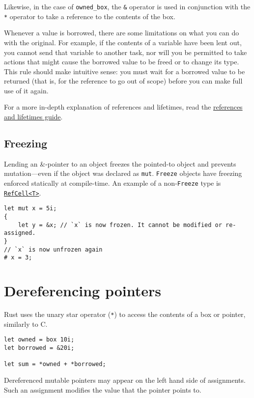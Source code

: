 \documentclass[]{article}
\begin{document}
Likewise, in the case of \texttt{owned\_box}, the \texttt{\&} operator
is used in conjunction with the \texttt{*} operator to take a reference
to the contents of the box.

Whenever a value is borrowed, there are some limitations on what you can
do with the original. For example, if the contents of a variable have
been lent out, you cannot send that variable to another task, nor will
you be permitted to take actions that might cause the borrowed value to
be freed or to change its type. This rule should make intuitive sense:
you must wait for a borrowed value to be returned (that is, for the
reference to go out of scope) before you can make full use of it again.

For a more in-depth explanation of references and lifetimes, read the
\href{guide-lifetimes.html}{references and lifetimes guide}.

\subsection{Freezing}\label{freezing}

Lending an \&-pointer to an object freezes the pointed-to object and
prevents mutation---even if the object was declared as \texttt{mut}.
\texttt{Freeze} objects have freezing enforced statically at
compile-time. An example of a non-\texttt{Freeze} type is
\href{http://doc.rust-lang.org/std/cell/struct.RefCell.html}{\texttt{RefCell\textless{}T\textgreater{}}}.

\begin{verbatim}
let mut x = 5i;
{
    let y = &x; // `x` is now frozen. It cannot be modified or re-assigned.
}
// `x` is now unfrozen again
# x = 3;
\end{verbatim}

\section{Dereferencing pointers}\label{dereferencing-pointers}

Rust uses the unary star operator (\texttt{*}) to access the contents of
a box or pointer, similarly to C.

\begin{verbatim}
let owned = box 10i;
let borrowed = &20i;

let sum = *owned + *borrowed;
\end{verbatim}

Dereferenced mutable pointers may appear on the left hand side of
assignments. Such an assignment modifies the value that the pointer
points to.
\end{document}
